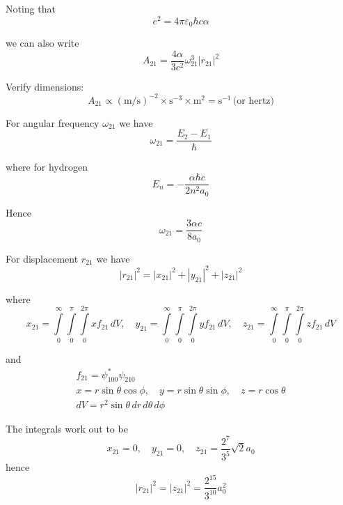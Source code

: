 Noting that
\begin{equation*}
e^2=4\pi\varepsilon_0\hbar c\alpha
\end{equation*}

we can also write
\begin{equation*}
A_{21}=\frac{4\alpha}{3c^2}\omega_{21}^3|r_{21}|^2
\tag{1}
\end{equation*}

Verify dimensions:
\begin{equation*}
A_{21}\propto(\text{m/s})^{-2}\times\text{s}^{-3}\times\text{m}^2=\text{s}^{-1}\,\text{(or hertz)}
\end{equation*}

For angular frequency $\omega_{21}$ we have
\begin{equation*}
\omega_{21}=\frac{E_2-E_1}{\hbar}
\end{equation*}

where for hydrogen
\begin{equation*}
E_n=-\frac{\alpha\hbar c}{2n^2a_0}
\end{equation*}

Hence
\begin{equation*}
\omega_{21}=\frac{3\alpha c}{8a_0}
\end{equation*}

For displacement $r_{21}$ we have
\begin{equation*}
|r_{21}|^2=|x_{21}|^2+|y_{21}|^2+|z_{21}|^2
\end{equation*}

where
\begin{equation*}
x_{21}=\int\limits_{0}^{\infty}\int\limits_{0}^{\pi}\int\limits_{0}^{2\pi}xf_{21}\,dV,
\quad
y_{21}=\int\limits_{0}^{\infty}\int\limits_{0}^{\pi}\int\limits_{0}^{2\pi}yf_{21}\,dV,
\quad
z_{21}=\int\limits_{0}^{\infty}\int\limits_{0}^{\pi}\int\limits_{0}^{2\pi}zf_{21}\,dV
\end{equation*}

and
\begin{gather*}
f_{21}=\psi_{100}^*\psi_{210}%
\\[1ex]
x=r\sin\theta\cos\phi,
\quad
y=r\sin\theta\sin\phi,
\quad
z=r\cos\theta
\\[1ex]
dV=r^2\sin\theta\,dr\,d\theta\,d\phi
\end{gather*}

The integrals work out to be
\begin{equation*}
x_{21}=0,
\quad
y_{21}=0,
\quad
z_{21}=\frac{2^7}{3^5}\sqrt2a_0
\end{equation*}
hence
\begin{equation*}
|r_{21}|^2=|z_{21}|^2=\frac{2^{15}}{3^{10}}a_0^2
\end{equation*}

